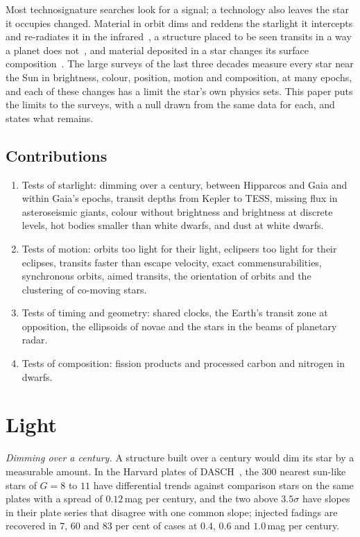 \documentclass[3p,11pt]{elsarticle}
\begin{document}
Most technosignature searches look for a signal; a technology also leaves the star it
occupies changed. Material in orbit dims and reddens the starlight it intercepts and
re-radiates it in the infrared~\cite{Dyson1960,Wright2014}, a structure placed to be seen
transits in a way a planet does not~\cite{Arnold2005}, and material deposited in a star
changes its surface composition~\cite{WhitmireWright1980}. The large surveys of the last
three decades measure every star near the Sun in brightness, colour, position, motion
and composition, at many epochs, and each of these changes has a limit the star's own
physics sets. This paper puts the limits to the surveys, with a null drawn from the same
data for each, and states what remains.

\subsection{Contributions}
\begin{enumerate}[leftmargin=*,itemsep=1pt]
\item Tests of starlight: dimming over a century, between Hipparcos and Gaia and within
Gaia's epochs, transit depths from Kepler to TESS, missing flux in asteroseismic giants, colour without brightness and
brightness at discrete levels, hot bodies smaller than white dwarfs, and dust at white
dwarfs.
\item Tests of motion: orbits too light for their light, eclipsers too light for their
eclipses, transits faster than escape velocity, exact commensurabilities, synchronous
orbits, aimed transits, the orientation of orbits and the clustering of co-moving stars.
\item Tests of timing and geometry: shared clocks, the Earth's transit zone at
opposition, the ellipsoids of novae and the stars in the beams of planetary radar.
\item Tests of composition: fission products and processed carbon and nitrogen in dwarfs.
\end{enumerate}

\section{Light}\label{sec:light}

\emph{Dimming over a century.} A structure built over a century would dim its star by a
measurable amount. In the Harvard plates of DASCH~\cite{Tang2013}, the $300$ nearest
sun-like stars of $G=8$ to $11$ have differential trends against comparison stars on the
same plates with a spread of $0.12$\,mag per century, and the two above $3.5\sigma$ have
slopes in their plate series that disagree with one common slope; injected fadings are
recovered in $7$, $60$ and $83$ per cent of cases at $0.4$, $0.6$ and $1.0$\,mag per
century.
\end{document}
